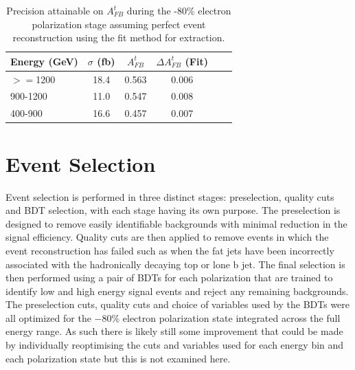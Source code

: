 \begin{table}
  \centering
  \begin{tabular}{l|c|c|c|c|c}
    \toprule
    Energy (GeV) &  $\sigma$ (fb)   & $A_{FB}^t$  & $\Delta A_{FB}^t$ (Fit) \\
    \midrule
    $>=$1200 & 18.4  & 0.563 & 0.006 \\
    \midrule
    900-1200 & 11.0 & 0.547 & 0.008 \\
    \midrule
    400-900 & 16.6 & 0.457 & 0.007 \\
    \bottomrule
  \end{tabular}
  \caption{Precision attainable on $A_{FB}^t$ during the -80\% electron polarization stage assuming perfect event reconstruction using the fit method for extraction.}
  \label{table:idealresults}
\end{table}


\section{Event Selection}
\label{Event Selection}

Event selection is performed in three distinct stages: preselection, quality cuts and \ac{BDT} selection, with each stage having its own purpose. The preselection is designed to remove easily identifiable backgrounds with minimal reduction in the signal efficiency. Quality cuts are then applied to remove events in which the event reconstruction has failed such as when the fat jets have been incorrectly associated with the hadronically decaying top or lone b jet. The final selection is then performed using a pair of \ac{BDT}s for each polarization that are trained to identify low and high energy signal events and reject any remaining backgrounds. The preselection cuts, quality cuts and choice of variables used by the \ac{BDT}s were all optimized for the $-$80\% electron polarization state integrated across the full energy range. As such there is likely still some improvement that could be made by individually reoptimising the cuts and variables used for each energy bin and each polarization state but this is not examined here.

